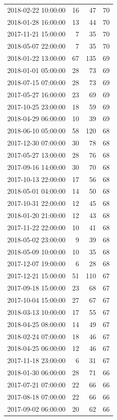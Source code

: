 \begin{tabular}{lrrr}
2018-02-22 10:00:00 & 16 & 47 & 70 \\
2018-01-28 16:00:00 & 13 & 44 & 70 \\
2017-11-21 15:00:00 & 7 & 35 & 70 \\
2018-05-07 22:00:00 & 7 & 35 & 70 \\
2018-01-22 13:00:00 & 67 & 135 & 69 \\
2018-01-01 05:00:00 & 28 & 73 & 69 \\
2018-07-15 07:00:00 & 28 & 73 & 69 \\
2017-05-27 16:00:00 & 23 & 69 & 69 \\
2017-10-25 23:00:00 & 18 & 59 & 69 \\
2018-04-29 06:00:00 & 10 & 39 & 69 \\
2018-06-10 05:00:00 & 58 & 120 & 68 \\
2017-12-30 07:00:00 & 30 & 78 & 68 \\
2017-05-27 13:00:00 & 28 & 76 & 68 \\
2017-09-16 14:00:00 & 30 & 70 & 68 \\
2017-10-13 22:00:00 & 17 & 56 & 68 \\
2018-05-01 04:00:00 & 14 & 50 & 68 \\
2017-10-31 22:00:00 & 12 & 45 & 68 \\
2018-01-20 21:00:00 & 12 & 43 & 68 \\
2017-11-22 22:00:00 & 10 & 41 & 68 \\
2018-05-02 23:00:00 & 9 & 39 & 68 \\
2018-05-09 10:00:00 & 10 & 35 & 68 \\
2017-12-07 19:00:00 & 6 & 28 & 68 \\
2017-12-21 15:00:00 & 51 & 110 & 67 \\
2017-09-18 15:00:00 & 23 & 68 & 67 \\
2017-10-04 15:00:00 & 27 & 67 & 67 \\
2018-03-13 10:00:00 & 17 & 55 & 67 \\
2018-04-25 08:00:00 & 14 & 49 & 67 \\
2018-02-24 07:00:00 & 18 & 46 & 67 \\
2018-04-25 06:00:00 & 12 & 46 & 67 \\
2017-11-18 23:00:00 & 6 & 31 & 67 \\
2018-01-30 06:00:00 & 28 & 71 & 66 \\
2017-07-21 07:00:00 & 22 & 66 & 66 \\
2017-08-18 07:00:00 & 22 & 66 & 66 \\
2017-09-02 06:00:00 & 20 & 62 & 66 \\

\end{tabular}
